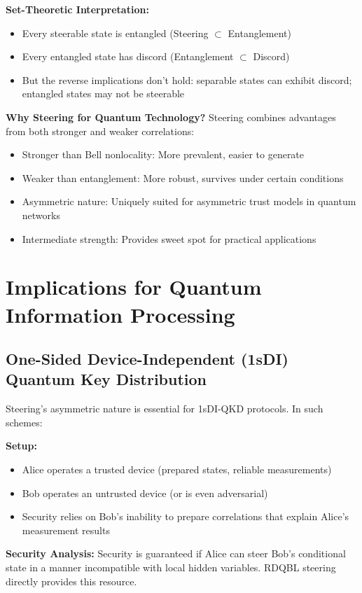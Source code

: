 \textbf{Set-Theoretic Interpretation:}
\begin{itemize}
	\item Every steerable state is entangled (Steering $\subset$ Entanglement)
	\item Every entangled state has discord (Entanglement $\subset$ Discord)
	\item But the reverse implications don't hold: separable states can exhibit discord; entangled states may not be steerable
\end{itemize}

\textbf{Why Steering for Quantum Technology?}
Steering combines advantages from both stronger and weaker correlations:
\begin{itemize}
	\item Stronger than Bell nonlocality: More prevalent, easier to generate
	\item Weaker than entanglement: More robust, survives under certain conditions
	\item Asymmetric nature: Uniquely suited for asymmetric trust models in quantum networks
	\item Intermediate strength: Provides sweet spot for practical applications
\end{itemize}

\section{Implications for Quantum Information Processing}

\subsection{One-Sided Device-Independent (1sDI) Quantum Key Distribution}

Steering's asymmetric nature is essential for 1sDI-QKD protocols. In such schemes:

\textbf{Setup:}
\begin{itemize}
	\item Alice operates a trusted device (prepared states, reliable measurements)
	\item Bob operates an untrusted device (or is even adversarial)
	\item Security relies on Bob's inability to prepare correlations that explain Alice's measurement results
\end{itemize}

\textbf{Security Analysis:}
Security is guaranteed if Alice can steer Bob's conditional state in a manner incompatible with local hidden variables. RDQBL steering directly provides this resource.

